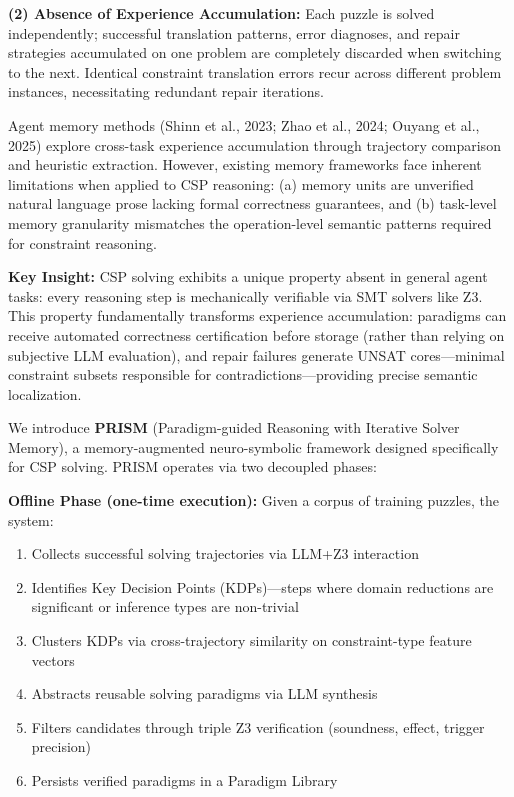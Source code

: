 \documentclass[letterpaper]{article}
\begin{document}
\textbf{(2) Absence of Experience Accumulation:} Each puzzle is solved independently; successful translation patterns, error diagnoses, and repair strategies accumulated on one problem are completely discarded when switching to the next. Identical constraint translation errors recur across different problem instances, necessitating redundant repair iterations.

Agent memory methods (Shinn et al., 2023; Zhao et al., 2024; Ouyang et al., 2025) explore cross-task experience accumulation through trajectory comparison and heuristic extraction. However, existing memory frameworks face inherent limitations when applied to CSP reasoning: (a) memory units are unverified natural language prose lacking formal correctness guarantees, and (b) task-level memory granularity mismatches the operation-level semantic patterns required for constraint reasoning.

\textbf{Key Insight:} CSP solving exhibits a unique property absent in general agent tasks: every reasoning step is mechanically verifiable via SMT solvers like Z3. This property fundamentally transforms experience accumulation: paradigms can receive automated correctness certification before storage (rather than relying on subjective LLM evaluation), and repair failures generate UNSAT cores—minimal constraint subsets responsible for contradictions—providing precise semantic localization.

We introduce \textbf{PRISM} (Paradigm-guided Reasoning with Iterative Solver Memory), a memory-augmented neuro-symbolic framework designed specifically for CSP solving. PRISM operates via two decoupled phases:

\textbf{Offline Phase (one-time execution):} Given a corpus of training puzzles, the system:
\begin{enumerate}
    \item Collects successful solving trajectories via LLM+Z3 interaction
    \item Identifies Key Decision Points (KDPs)—steps where domain reductions are significant or inference types are non-trivial
    \item Clusters KDPs via cross-trajectory similarity on constraint-type feature vectors
    \item Abstracts reusable solving paradigms via LLM synthesis
    \item Filters candidates through triple Z3 verification (soundness, effect, trigger precision)
    \item Persists verified paradigms in a Paradigm Library
\end{enumerate}
\end{document}
